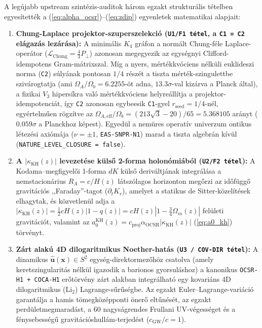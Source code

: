 \documentclass[11pt,a4paper]{article}
\begin{document}
A legújabb upstream szintézis-auditok három egzakt strukturális tételben egyesítették a (\ref{eq:alpha_ocsr})--(\ref{eq:zdip}) egyenletek matematikai alapjait:
\begin{enumerate}
  \item \textbf{Chung-Laplace projektor-szuperszelekció (\texttt{U1/F1 tétel}, a \texttt{C1 = C2} elágazás lezárása):} A minimális $K_4$ gráfon a normált Chung-féle Laplace-operátor ($\mathcal{L}_{\mathrm{Chung}} = \frac{4}{3}P_\perp$) azonosan megegyezik az egységnyi Clifford-idempotens Gram-mátrixszal. Míg a nyers, mértékkvóciens nélküli euklideszi norma (\texttt{C2}) súlyának pontosan $1/4$ részét a tiszta mérték-szingulettbe szivárogtatja (ami $\Omega_A/\Omega_b = 6.2255$-öt adna, $13.3\sigma$-val kizárva a Planck által), a fizikai $V_3$ hipersíkra való mértékkvóciens helyreállítja a projektor-idempotenciát, így \texttt{C2} azonosan egybeesik \texttt{C1}-gyel $r_{\mathrm{seed}} = 1/4$-nél, egyértelműen rögzítve az $\Omega_{A,\mathrm{eff}}/\Omega_b = (213\sqrt{3}-20)/65 = 5.368105$ arányt ($0.059\sigma$ a Planckhoz képest). Egyedül a nemüres operatív univerzum ontikus létezési axiómája ($\nu = \pm 1$, \texttt{EAS-SNPR-N1}) marad a tiszta algebrán kívül (\texttt{NATURE\_LEVEL\_CLOSURE = false}).
  \item \textbf{A $|\kappa_{\mathrm{KH}}(z)|$ levezetése külső 2-forma holonómiából (\texttt{U2/F2 tétel}):} A Kodama--megfigyelői 1-forma $dK$ külső deriváltjának integrálása a nemstacionárius $R_A = c/H(z)$ látszólagos horizonton megőrzi az időfüggő gravitációs ,,Faraday''-tagot ($\partial_t K_r$), amelyet a statikus de Sitter-közelítések elhagytak, és közvetlenül adja a $|\kappa_{\mathrm{KH}}(z)| = \frac{1}{2}c H(z)|1 - q(z)| = c H(z)\left|1 - \frac{3}{4}\Omega_m(z)\right|$ felületi gravitációt, valamint az $a_0^{\mathrm{KH}}(z) = c_{\mathrm{proj}}\alpha_{\mathrm{OCSR}}|\kappa_{\mathrm{KH}}(z)|$ (\ref{eq:a0_kh}) törvényt.
  \item \textbf{Zárt alakú 4D dilogaritmikus Noether-hatás (\texttt{U3 / COV-DIR tétel}):} A dinamikus $\hat{\mathbf{u}}(\mathbf{x}) \in S^2$ egység-direktormezőhöz csatolva (amely keretszingularitás nélkül igazodik a barionos gyorsuláshoz) a kanonikus \texttt{OCSR-H1 + COCA-H1} erőtörvény zárt alakban integrálható egy kovariáns 4D dilogaritmikus ($\mathrm{Li}_2$) Lagrange-sűrűségbe. Az egzakt Euler--Lagrange-variáció garantálja a hamis tömegközépponti önerő eltűnését, az egzakt perdületmegmaradást, a 60 nagyságrendes Frullani UV-végességet és a fénysebességű gravitációshullám-terjedést ($c_{\mathrm{GW}}/c = 1$).
\end{enumerate}
\end{document}
